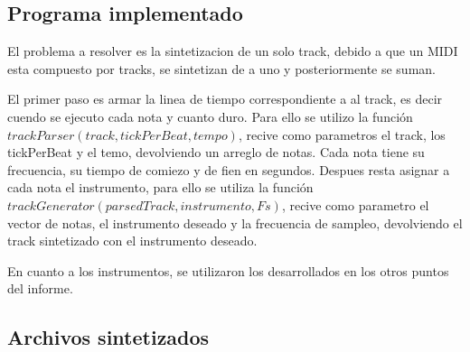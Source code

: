 \documentclass[../ASSD_TP2.tex]{subfiles}
\begin{document}
\subsection*{Programa implementado}
El problema a resolver es la sintetizacion de un solo track, debido a que un MIDI esta compuesto por tracks, se sintetizan de a uno y posteriormente se suman.
\par El primer paso es armar la linea de tiempo correspondiente a al track, es decir cuendo se ejecuto cada nota y cuanto duro. Para ello se utilizo la función $trackParser (track,tickPerBeat,tempo)$, recive como parametros el track, los tickPerBeat y el temo, devolviendo un arreglo de notas. Cada nota tiene su frecuencia, su tiempo de comiezo y de fien en segundos.
Despues resta asignar a cada nota el instrumento, para ello se utiliza la función $trackGenerator(parsedTrack,instrumento,Fs)$, recive como parametro el vector de notas, el instrumento deseado y la frecuencia de sampleo, devolviendo el track sintetizado con el instrumento deseado.
\par En cuanto a los instrumentos, se utilizaron los desarrollados en los otros  puntos del informe.

\subsection*{Archivos sintetizados}
\end{document}
